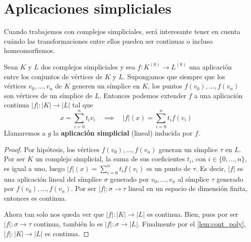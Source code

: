 \section{Aplicaciones simpliciales}

Cuando trabajemos con complejos simpliciales, será interesante tener en cuenta cuándo
las transformaciones entre ellos pueden ser continuas o incluso homeomorfismos.

\begin{lema}
	\label{lem:app-simpl}
	Sean \(K\) y \(L\) dos complejos simpliciales y sea \(f: K^{(0)}\rightarrow L^{(0)}\)
	una aplicación entre los conjuntos de vértices de \(K\) y \(L\). Supongamos que
	siempre que los vértices \(v_{0}, \ldots, v_{n}\) de \(K\) generen un símplice en
	\(K\), los puntos \(f(v_{0}), \ldots, f(v_{n})\) son vértices de un símplice de \(L\).
	Entonces podemos extender \(f\) a una aplicación continua
	\( |f| :|K| \rightarrow |L|\) tal que
	\[
		x = \sum_{i=0}^{n}t_{i}v_{i}\quad \implies \quad |f|(x) = \sum_{i=0}^{n}t_{i}f
		(v_{i})
	\]
	Llamaremos a \(g\) la \textbf{aplicación simplicial} (lineal) inducida por \(f\).
\end{lema}
\begin{proof}
	Por hipótesis, los vértices \(f(v_{0}), \ldots, f(v_{n})\) generan un símplice
	\(\tau\) en \(L\). Por ser \(K\) un complejo simplicial, la suma de sus coeficientes
	\(t_{i}\), con \(i \in \{0, \ldots, n\}\), es igual a uno, luego \(|f|(x) = \sum_{i=0}^{n}
	t_{i}f(v_{i})\) es un punto de \(\tau\). Es decir, \(|f|\) es una aplicación lineal del
	símplice \(\sigma\) generado por \(v_{0}, \ldots, v_{n}\) al símplice \(\tau\) generado
	por \(f(v_{0}), \ldots, f(v_{n})\). Por ser \( |f| : \sigma \rightarrow \tau\) lineal
	en un espacio de dimensión finita, entonces es continua.

	Ahora tan solo nos queda ver que \( |f| :|K| \rightarrow |L|\) es continua. Bien, pues
	por ser \( |f| : \sigma \rightarrow \tau\) continua, también lo es
	\( |f| : \sigma \rightarrow |L|\). Finalmente por el \autoref{lem:cont_poly},
	\( |f| :|K| \rightarrow |L|\) es continua.
\end{proof}
%
%
%

